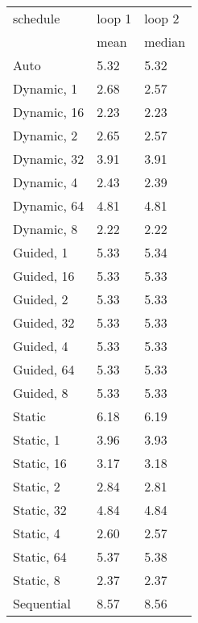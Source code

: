 \begin{tabu}{l|ll}
            schedule &loop 1 &loop 2 \\
                     &mean &median \\            \hline
Auto&5.32 &5.32\\
Dynamic, 1&2.68 &2.57\\
Dynamic, 16&2.23 &2.23\\
Dynamic, 2&2.65 &2.57\\
Dynamic, 32&3.91 &3.91\\
Dynamic, 4&2.43 &2.39\\
Dynamic, 64&4.81 &4.81\\
Dynamic, 8&2.22 &2.22\\
Guided, 1&5.33 &5.34\\
Guided, 16&5.33 &5.33\\
Guided, 2&5.33 &5.33\\
Guided, 32&5.33 &5.33\\
Guided, 4&5.33 &5.33\\
Guided, 64&5.33 &5.33\\
Guided, 8&5.33 &5.33\\
Static&6.18 &6.19\\
Static, 1&3.96 &3.93\\
Static, 16&3.17 &3.18\\
Static, 2&2.84 &2.81\\
Static, 32&4.84 &4.84\\
Static, 4&2.60 &2.57\\
Static, 64&5.37 &5.38\\
Static, 8&2.37 &2.37\\
Sequential&8.57 &8.56\\
\end{tabu}